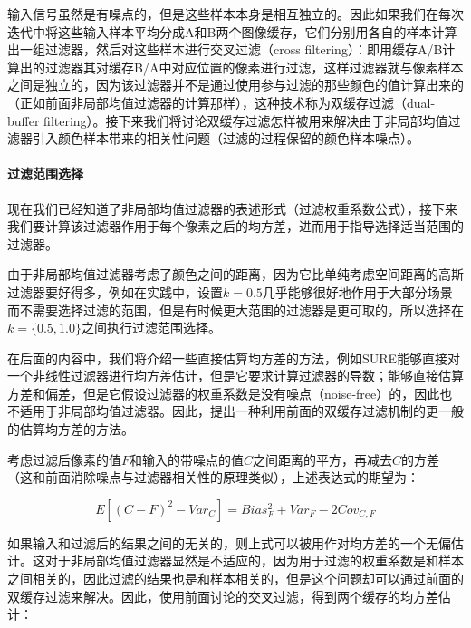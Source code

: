 输入信号虽然是有噪点的，但是这些样本本身是相互独立的。因此如果我们在每次迭代中将这些输入样本平均分成A和B两个图像缓存，它们分别用各自的样本计算出一组过滤器，然后对这些样本进行交叉过滤（cross filtering）：即用缓存A/B计算出的过滤器其对缓存B/A中对应位置的像素进行过滤，这样过滤器就与像素样本之间是独立的，因为该过滤器并不是通过使用参与过滤的那些颜色的值计算出来的（正如前面非局部均值过滤器的计算那样），这种技术称为双缓存过滤（dual-buffer filtering）。接下来我们将讨论双缓存过滤怎样被用来解决由于非局部均值过滤器引入颜色样本带来的相关性问题（过滤的过程保留的颜色样本噪点）。





\paragraph{过滤范围选择}
现在我们已经知道了非局部均值过滤器的表述形式（过滤权重系数公式），接下来我们要计算该过滤器作用于每个像素之后的均方差，进而用于指导选择适当范围的过滤器。

由于非局部均值过滤器考虑了颜色之间的距离，因为它比单纯考虑空间距离的高斯过滤器要好得多，例如在实践中，设置$k=0.5$几乎能够很好地作用于大部分场景而不需要选择过滤的范围，但是有时候更大范围的过滤器是更可取的，所以\cite{a:NonlinearlyWeightedFirstorderRegressionforDenoisingMonteCarloRenderings}选择在$k=\{0.5,1.0\}$之间执行过滤范围选择。

在后面的内容中，我们将介绍一些直接估算均方差的方法，例如SURE\cite{a:SUREbasedOptimizationforAdaptiveSamplingandReconstruction}能够直接对一个非线性过滤器进行均方差估计，但是它要求计算过滤器的导数；\cite{a:AdaptiveRenderingbasedonWeightedLocalRegression}能够直接估算方差和偏差，但是它假设过滤器的权重系数是没有噪点（noise-free）的，因此也不适用于非局部均值过滤器。因此，\cite{a:NonlinearlyWeightedFirstorderRegressionforDenoisingMonteCarloRenderings}提出一种利用前面的双缓存过滤机制的更一般的估算均方差的方法。

考虑过滤后像素的值$F$和输入的带噪点的值$C$之间距离的平方，再减去$C$的方差（这和前面消除噪点与过滤器相关性的原理类似），上述表达式的期望为：

\begin{equation}
	E[(C-F)^{2}-Var_C]=Bias^{2}_F+Var_F-2Cov_{C,F}
\end{equation}

\noindent 如果输入和过滤后的结果之间的无关的，则上式可以被用作对均方差的一个无偏估计。这对于非局部均值过滤器显然是不适应的，因为用于过滤的权重系数是和样本之间相关的，因此过滤的结果也是和样本相关的，但是这个问题却可以通过前面的双缓存过滤来解决。因此，使用前面讨论的交叉过滤，得到两个缓存的均方差估计：

